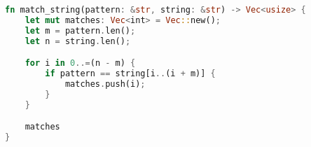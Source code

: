 \begin{lstlisting}[language=Rust,caption={Rust naive implementation},label={lst:naive_rust}]
fn match_string(pattern: &str, string: &str) -> Vec<usize> {
    let mut matches: Vec<int> = Vec::new();
    let m = pattern.len();
    let n = string.len();

    for i in 0..=(n - m) {
        if pattern == string[i..(i + m)] {
            matches.push(i);
        }
    }

    matches
}
\end{lstlisting}
